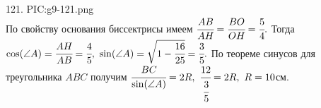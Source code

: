 121. {{PIC:g9-121.png}}\\
По свойству основания биссектрисы имеем $\cfrac{AB}{AH}=\cfrac{BO}{OH}=\cfrac{5}{4}.$ Тогда $\cos(\angle A)=\cfrac{AH}{AB}=\cfrac{4}{5},\ \sin(\angle A)=\sqrt{1-\cfrac{16}{25}}=\cfrac{3}{5}.$ По теореме синусов для треугольника $ABC$ получим $\cfrac{BC}{\sin(\angle A)}=2R,\ \cfrac{12}{\cfrac{3}{5}}=2R,\ R=10$см.\\
